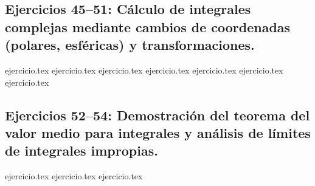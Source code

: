 \subsection*{Ejercicios 45--51: Cálculo de integrales complejas mediante cambios de coordenadas (polares, esféricas) y transformaciones.}
\begin{enumerate}
    \setcounter{enumi}{44}
    {ejercicio.tex}
    {ejercicio.tex}
    {ejercicio.tex}
    {ejercicio.tex}
    {ejercicio.tex}
    {ejercicio.tex}
    {ejercicio.tex}
\end{enumerate}

\subsection*{Ejercicios 52--54: Demostración del teorema del valor medio para integrales y análisis de límites de integrales impropias.}
\begin{enumerate}
    \setcounter{enumi}{51}
    {ejercicio.tex}
    {ejercicio.tex}
    {ejercicio.tex}
\end{enumerate}
